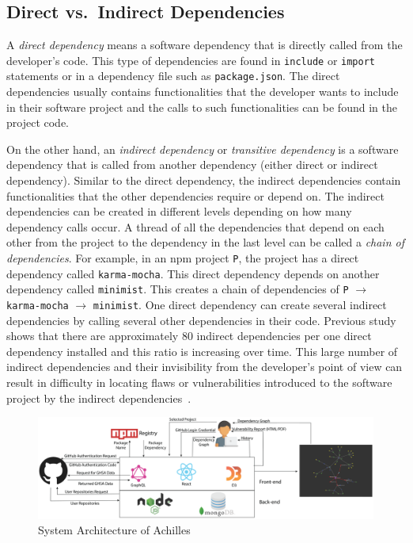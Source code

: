 \documentclass[conference]{IEEEtran}
\begin{document}
	\subsection{Direct vs.~Indirect Dependencies}
	A \textit{direct dependency} means a software dependency that is directly called from the developer's code. This type of dependencies are found in \texttt{include} or \texttt{import} statements or in a dependency file such as \texttt{package.json}. The direct dependencies usually contains functionalities that the developer wants to include in their software project and the calls to such functionalities can be found in the project code. 
	
	On the other hand, an \textit{indirect dependency} or \textit{transitive dependency} is a software dependency that is called from another dependency (either direct or indirect dependency). Similar to the direct dependency, the indirect dependencies contain functionalities that the other dependencies require or depend on. The indirect dependencies can be created in different levels depending on how many dependency calls occur. A thread of all the dependencies that depend on each other from the project to the dependency in the last level can be called a \textit{chain of dependencies}. For example, in an npm project \texttt{P}, the project has a direct dependency called \texttt{karma-mocha}. This direct dependency depends on another dependency called \texttt{minimist}. This creates a chain of dependencies of \texttt{P} $\rightarrow$ \texttt{karma-mocha} $\rightarrow$ \texttt{minimist}.
	One direct dependency can create several indirect dependencies by calling several other dependencies in their code. Previous study~\cite{Zimmermann2019} shows that there are approximately 80 indirect dependencies per one direct dependency installed and this ratio is increasing over time. This large number of indirect dependencies and their invisibility from the developer's point of view can result in difficulty in locating flaws or vulnerabilities introduced to the software project by the indirect dependencies~\cite{Cox2019,Snyk2020}.
	
	\begin{figure}[!tb]
		\centering
		\includegraphics[width=2\columnwidth]{Figures/sys-arch-2.png}
		\caption{System Architecture of Achilles}
		\label{fig:system_architecture}
	\end{figure}
	
\end{document}
